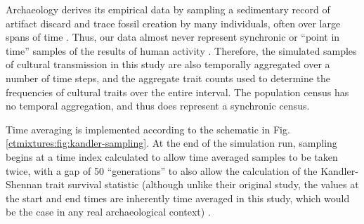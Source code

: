 Archaeology derives its empirical data by sampling a sedimentary record of artifact discard and trace fossil creation by many individuals, often over large spans of time \citep{schiffer1983toward,Schiffer1987,stein2001review,Stein1987,Stein1993,stein2001review,stein2003big}.  Thus, our data almost never represent synchronic or ``point in time'' samples of the results of human activity \citep{grayson1998,lyman2003influence,Madsen2012TA,Porcic2014Exploring-the-E,Premo:2014jv}.  Therefore, the simulated samples of cultural transmission in this study are also temporally aggregated over a number of time steps, and the aggregate trait counts used to determine the frequencies of cultural traits over the entire interval.  The population census has no temporal aggregation, and thus does represent a synchronic census.  

Time averaging is implemented according to the schematic in Fig. \ref{ctmixtures:fig:kandler-sampling}.  At the end of the simulation run, sampling begins at a time index calculated to allow time averaged samples to be taken twice, with a gap of 50 ``generations'' to also allow the calculation of the Kandler-Shennan trait survival statistic (although unlike their original study, the values at the start and end times are inherently time averaged in this study, which would be the case in any real archaeological context) \citep{Kandler2013}.

